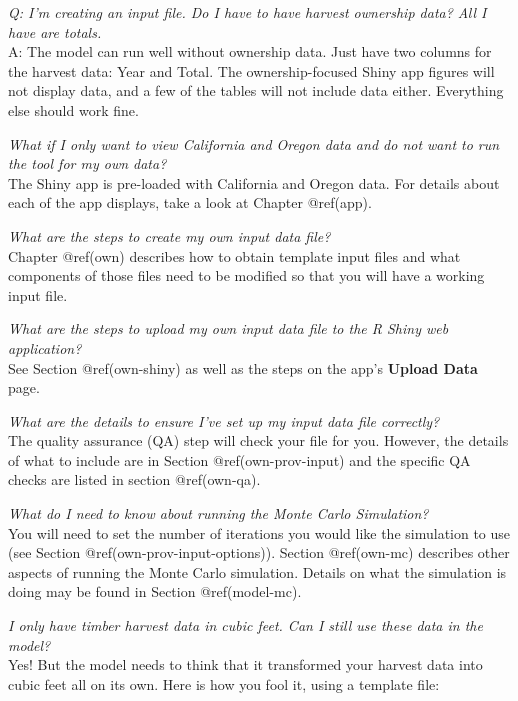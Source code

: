 \documentclass[
  openany]{book}
\begin{document}
\emph{Q: I'm creating an input file. Do I have to have harvest ownership
data? All I have are totals.}\\
A: The model can run well without ownership data. Just have two columns
for the harvest data: Year and Total. The ownership-focused Shiny app
figures will not display data, and a few of the tables will not include
data either. Everything else should work fine.

\emph{What if I only want to view California and Oregon data and do not
want to run the tool for my own data?}\\
The Shiny app is pre-loaded with California and Oregon data. For details
about each of the app displays, take a look at Chapter @ref(app).

\emph{What are the steps to create my own input data file?}\\
Chapter @ref(own) describes how to obtain template input files and what
components of those files need to be modified so that you will have a
working input file.

\emph{What are the steps to upload my own input data file to the R Shiny
web application?}\\
See Section @ref(own-shiny) as well as the steps on the app's
\textbf{Upload Data} page.

\emph{What are the details to ensure I've set up my input data file
correctly? }\\
The quality assurance (QA) step will check your file for you. However,
the details of what to include are in Section @ref(own-prov-input) and
the specific QA checks are listed in section @ref(own-qa).

\emph{What do I need to know about running the Monte Carlo Simulation?
}\\
You will need to set the number of iterations you would like the
simulation to use (see Section @ref(own-prov-input-options)). Section
@ref(own-mc) describes other aspects of running the Monte Carlo
simulation. Details on what the simulation is doing may be found in
Section @ref(model-mc).

\emph{I only have timber harvest data in cubic feet. Can I still use
these data in the model?}\\
Yes! But the model needs to think that it transformed your harvest data
into cubic feet all on its own. Here is how you fool it, using a
template file:
\end{document}
